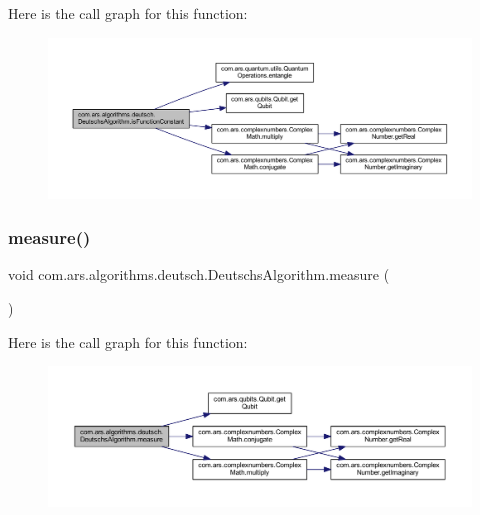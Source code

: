Here is the call graph for this function\+:\nopagebreak
\begin{figure}[H]
\begin{center}
\leavevmode
\includegraphics[width=350pt]{classcom_1_1ars_1_1algorithms_1_1deutsch_1_1_deutschs_algorithm_a853d89cbac22f31c9b0fd24e53c3930d_cgraph}
\end{center}
\end{figure}
\hypertarget{classcom_1_1ars_1_1algorithms_1_1deutsch_1_1_deutschs_algorithm_a205c99180da5c481f6733d07759de636}{}\label{classcom_1_1ars_1_1algorithms_1_1deutsch_1_1_deutschs_algorithm_a205c99180da5c481f6733d07759de636} 
\subsubsection{\texorpdfstring{measure()}{measure()}}
{\footnotesize\ttfamily void com.\+ars.\+algorithms.\+deutsch.\+Deutschs\+Algorithm.\+measure (\begin{DoxyParamCaption}{ }\end{DoxyParamCaption})}

Here is the call graph for this function\+:\nopagebreak
\begin{figure}[H]
\begin{center}
\leavevmode
\includegraphics[width=350pt]{classcom_1_1ars_1_1algorithms_1_1deutsch_1_1_deutschs_algorithm_a205c99180da5c481f6733d07759de636_cgraph}
\end{center}
\end{figure}
\hypertarget{classcom_1_1ars_1_1algorithms_1_1deutsch_1_1_deutschs_algorithm_afb9f22b5a65a36c5a2828e7f06e4563e}{}\label{classcom_1_1ars_1_1algorithms_1_1deutsch_1_1_deutschs_algorithm_afb9f22b5a65a36c5a2828e7f06e4563e} 
